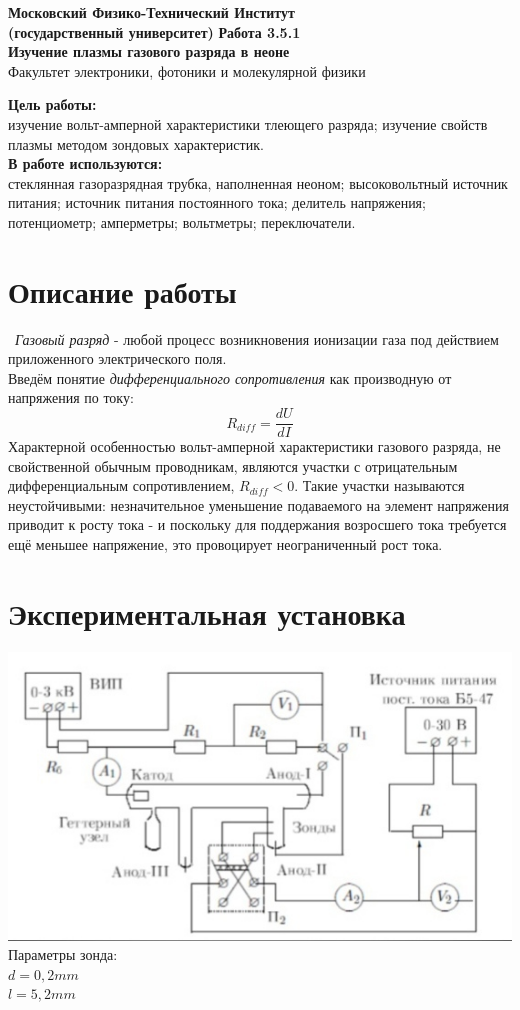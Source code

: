 \documentclass[11pt]{article}
\begin{document}
\begin{titlepage}
\begin{center}
\large\textbf{Московский Физико-Технический Институт}\\
\large\textbf{(государственный университет)}
\vfill
\huge\textbf{ Работа 3.5.1}\\
\huge\textbf{Изучение плазмы газового разряда в неоне}\\
\vfill
\large Факультет электроники, фотоники и молекулярной физики\\
\end{center}
\end{titlepage}
\noindent \textbf{Цель работы:} \\
\indent изучение вольт-амперной характеристики тлеющего разряда; изучение свойств плазмы методом зондовых характеристик.\\
\noindent \textbf{В работе используются:} \\
\indent стеклянная газоразрядная трубка, наполненная неоном; высоковольтный источник питания; источник питания постоянного тока; делитель напряжения; потенциометр; амперметры; вольтметры; переключатели.
\section*{Описание работы}\
\emph{Газовый разряд} - любой процесс возникновения ионизации газа под действием приложенного электрического поля.\\
Введём понятие \emph{дифференциального сопротивления} как производную от напряжения по току:
$$R_{diff} = \frac{dU}{dI}$$
Характерной особенностью вольт-амперной характеристики газового разряда, не свойственной обычным проводникам, являются участки с отрицательным дифференциальным сопротивлением, $R_{diff} < 0$. Такие участки называются неустойчивыми: незначительное уменьшение подаваемого на элемент напряжения приводит к росту тока - и поскольку для поддержания возросшего тока требуется ещё меньшее напряжение, это провоцирует неограниченный рост тока.\\
\section*{Экспериментальная установка}
\includegraphics[width = 16cm]{3511}\\
Параметры зонда:\\
$d = 0,2mm$\\
$l = 5,2mm$\\
\end{document}
